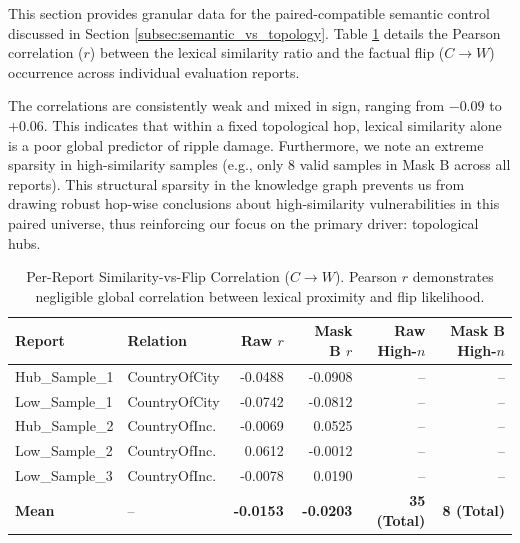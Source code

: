 This section provides granular data for the paired-compatible semantic control discussed in Section \ref{subsec:semantic_vs_topology}. Table \ref{tab:semantic_corr} details the Pearson correlation ($r$) between the lexical similarity ratio and the factual flip ($C \rightarrow W$) occurrence across individual evaluation reports. 

The correlations are consistently weak and mixed in sign, ranging from $-0.09$ to $+0.06$. This indicates that within a fixed topological hop, lexical similarity alone is a poor global predictor of ripple damage. Furthermore, we note an extreme sparsity in high-similarity samples (e.g., only 8 valid samples in Mask B across all reports). This structural sparsity in the knowledge graph prevents us from drawing robust hop-wise conclusions about high-similarity vulnerabilities in this paired universe, thus reinforcing our focus on the primary driver: topological hubs.

\begin{table}[htbp]
\centering
\small
\begin{tabular}{llrrrr}
\toprule
\textbf{Report} & \textbf{Relation} & \textbf{Raw $r$} & \textbf{Mask B $r$} & \textbf{Raw High-$n$} & \textbf{Mask B High-$n$} \\
\midrule
Hub\_Sample\_1 & CountryOfCity & -0.0488 & -0.0908 & -- & -- \\
Low\_Sample\_1  & CountryOfCity & -0.0742 & -0.0812 & -- & -- \\
Hub\_Sample\_2& CountryOfInc. & -0.0069 &  0.0525 & -- & -- \\
Low\_Sample\_2 & CountryOfInc. &  0.0612 & -0.0012 & -- & -- \\
Low\_Sample\_3 & CountryOfInc. & -0.0078 &  0.0190 & -- & -- \\
\midrule
\textbf{Mean} & -- & \textbf{-0.0153} & \textbf{-0.0203} & \textbf{35 (Total)} & \textbf{8 (Total)} \\
\bottomrule
\end{tabular}
\caption{Per-Report Similarity-vs-Flip Correlation ($C \rightarrow W$). Pearson $r$ demonstrates negligible global correlation between lexical proximity and flip likelihood.}
\label{tab:semantic_corr}
\end{table} %









